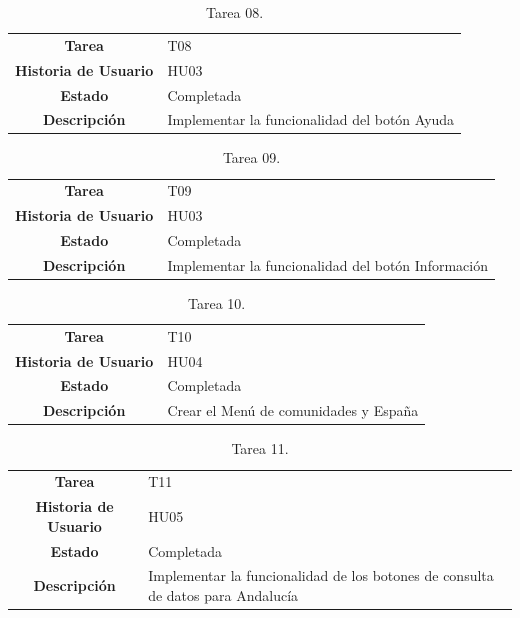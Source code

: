 \begin{table}[H]
	\begin{center}
		\begin{tabular}{| c | p{9cm} |}
			\hline
			
			\textbf{Tarea} & T08 \\
			\textbf{Historia de Usuario} & HU03 \\
			\textbf{Estado} & Completada \\
			\textbf{Descripción} & Implementar la funcionalidad del botón Ayuda \\ \hline
		\end{tabular}
		\caption{Tarea 08.}
	\end{center}
\end{table}

\begin{table}[H]
	\begin{center}
		\begin{tabular}{| c | p{9cm} |}
			\hline
			
			\textbf{Tarea} & T09 \\
			\textbf{Historia de Usuario} & HU03 \\
			\textbf{Estado} & Completada \\
			\textbf{Descripción} & Implementar la funcionalidad del botón Información \\ \hline
		\end{tabular}
		\caption{Tarea 09.}
	\end{center}
\end{table}

\begin{table}[H]
	\begin{center}
		\begin{tabular}{| c | p{9cm} |}
			\hline
			
			\textbf{Tarea} & T10 \\
			\textbf{Historia de Usuario} & HU04 \\
			\textbf{Estado} & Completada \\
			\textbf{Descripción} & Crear el Menú de comunidades y España \\ \hline
		\end{tabular}
		\caption{Tarea 10.}
	\end{center}
\end{table}

\begin{table}[H]
	\begin{center}
		\begin{tabular}{| c | p{9cm} |}
			\hline
			
			\textbf{Tarea} & T11 \\
			\textbf{Historia de Usuario} & HU05 \\
			\textbf{Estado} & Completada \\
			\textbf{Descripción} & Implementar la funcionalidad de los botones de consulta de datos para Andalucía \\ \hline
		\end{tabular}
		\caption{Tarea 11.}
	\end{center}
\end{table}

